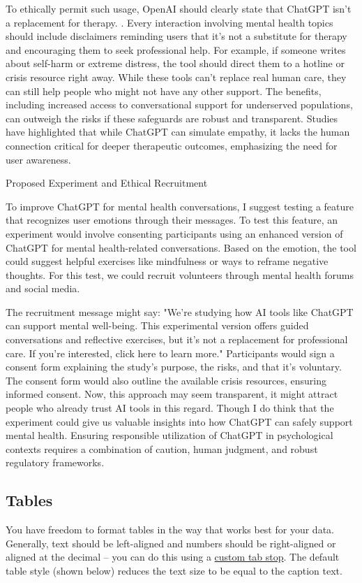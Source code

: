 \documentclass[
	letterpaper, %
]{jdf}
\begin{document}
To ethically permit such usage, OpenAI should clearly state that ChatGPT isn’t a replacement for therapy. . Every interaction involving mental health topics should include disclaimers reminding users that it’s not a substitute for therapy and encouraging them to seek professional help. For example, if someone writes about self-harm or extreme distress, the tool should direct them to a hotline or crisis resource right away. While these tools can’t replace real human care, they can still help people who might not have any other support. The benefits, including increased access to conversational support for underserved populations, can outweigh the risks if these safeguards are robust and transparent. Studies have highlighted that while ChatGPT can simulate empathy, it lacks the human connection critical for deeper therapeutic outcomes, emphasizing the need for user awareness. 

Proposed Experiment and Ethical Recruitment

To improve ChatGPT for mental health conversations, I suggest testing a feature that recognizes user emotions through their messages. To test this feature, an experiment would involve consenting participants using an enhanced version of ChatGPT for mental health-related conversations. Based on the emotion, the tool could suggest helpful exercises like mindfulness or ways to reframe negative thoughts. For this test, we could recruit volunteers through mental health forums and social media.

The recruitment message might say: "We’re studying how AI tools like ChatGPT can support mental well-being. This experimental version offers guided conversations and reflective exercises, but it’s not a replacement for professional care. If you’re interested, click here to learn more." Participants would sign a consent form explaining the study’s purpose, the risks, and that it’s voluntary. The consent form would also outline the available crisis resources, ensuring informed consent. Now, this approach may seem transparent, it might attract people who already trust AI tools in this regard. Though I do think that the experiment could give us valuable insights into how ChatGPT can safely support mental health. Ensuring responsible utilization of ChatGPT in psychological contexts requires a combination of caution, human judgment, and robust regulatory frameworks.


\newpage
\subsection{Tables}
You have freedom to format tables in the way that works best for your data. Generally, text should be left-aligned and numbers should be right-aligned or aligned at the decimal – you can do this using a \href{https://practicaltypography.com/tabs-and-tab-stops.html}{custom tab stop}. The default table style (shown below) reduces the text size to be equal to the caption text.
\end{document}
